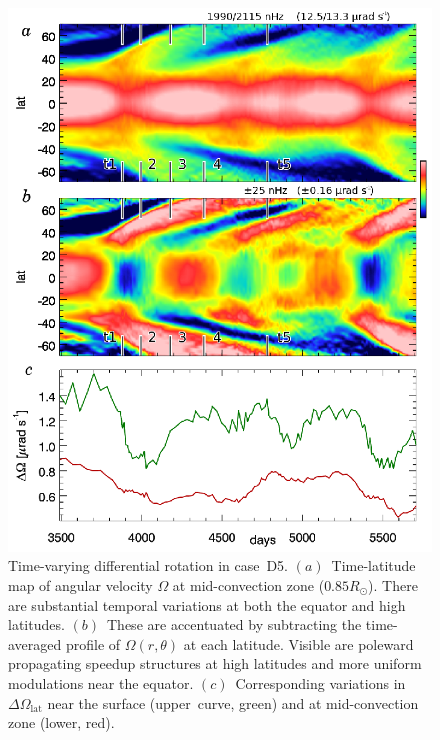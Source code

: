 \begin{figure}
  \begin{center}
    \includegraphics[width=0.8\linewidth]{figs/chapter_6/Figure_9/Figure_9.eps}
  \end{center}
  \caption[Time-varying differential rotation in case~D5] 
	  {Time-varying differential rotation in case~D5. 
    $(a)$~Time-latitude map of angular velocity $\Omega$ at
    mid-convection zone ($0.85R_\odot$).  There are substantial
    temporal variations at both the equator and high latitudes.  
    $(b)$~These are accentuated by subtracting the time-averaged
    profile of $\Omega(r,\theta)$ at each latitude.  Visible are
    poleward propagating speedup structures at high latitudes and more
    uniform modulations near the equator.
    $(c)$~Corresponding variations in $\Delta \Omega_\mathrm{lat}$
    near the surface (upper~curve, green) and at mid-convection zone
    (lower, red).
  \label{fig:case_D5_omega}}
\end{figure}

